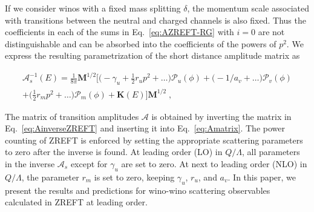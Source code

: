 \documentclass[%
 reprint,
 amsmath,amssymb,
 aps,
]{revtex4-1}
\begin{document}
If we consider winos with a fixed mass splitting $\delta$, the momentum scale associated with transitions between the neutral and charged channels is also fixed.
Thus the coefficients in each of the sums in Eq.~\eqref{eq:AZREFT-RG} with $i=0$ are not distinguishable and can be absorbed into the coefficients of the powers of $p^2$.
We express the resulting parametrization of the short distance amplitude matrix as
\begin{widetext}
\begin{eqnarray}
\label{eq:AinverseZREFT}
\bm{\mathcal{A}}_s^{-1}(E) = \frac{1}{8\pi} \bm{M}^{1/2} 
\Big[ \big(- \gamma_u + \tfrac12 r_u p^2 + \ldots \big) \bm{\mathcal{P}}_u(\phi)
 + \big(-1/a_v + \ldots \big) \bm{\mathcal{P}}_v(\phi)
 \nonumber
 \\
 + \big(\tfrac12 r_m p^2 + \ldots \big) \bm{\mathcal{P}}_m(\phi) + \bm{K}(E) \Big]
\bm{M}^{1/2} \;,
\end{eqnarray}
\end{widetext}
The matrix of transition amplitudes $\bm{\mathcal{A}}$ is obtained by inverting the matrix in Eq.~\eqref{eq:AinverseZREFT} and inserting it into Eq.~\eqref{eq:Amatrix}.
The power counting of ZREFT is enforced by setting the appropriate scattering parameters to zero after the inverse is found.
At leading order (LO) in $Q/\Lambda$, all parameters in the inverse $\bm{\mathcal{A}}_s$ except for $\gamma_u$ are set to zero.
At next to leading order (NLO) in $Q/\Lambda$, the parameter $r_m$ is set to zero, keeping $\gamma_u$, $r_u$, and $a_v$.
In this paper, we present the results and predictions for wino-wino scattering observables calculated in ZREFT at leading order.
\end{document}
